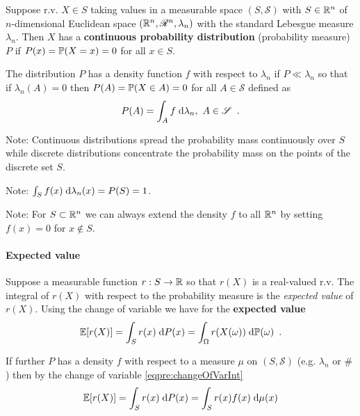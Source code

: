 \begin{definition}
Suppose r.v. $X \in S$ taking values in a measurable space $(S, \mathscr{S})$ with $S \in \mathbb{R}^n$ of $n$-dimensional Euclidean space $(\mathbb{R}^n, \mathscr{R}^n, \lambda_n)$ with the standard Lebesgue measure $\lambda_n$. Then $X$ has a \textbf{continuous probability distribution} (probability measure) $P$ if $P(x) = \mathbb{P}(X = x) = 0$ for all $x \in S$.
\end{definition}

The distribution $P$ has a density function $f$ with respect to $\lambda_n$ if $P \ll \lambda_n$ so that if $\lambda_n(A) = 0$ then $P(A) = \mathbb{P}(X \in A) = 0$ for all $A \in \mathscr{S}$ defined as
\begin{equation}
P(A) = \int_A f \; \text{d} \lambda_n, \ A \in \mathscr{S} \enspace .
\end{equation}

Note: Continuous distributions spread the probability mass continuously over $S$ while discrete distributions concentrate the probability mass on the points of the discrete set $S$.

Note: $\int_S f(x) \; \text{d} \lambda_n(x) = P(S) = 1$.

Note: For $S \subset \mathbb{R}^n$ we can always extend the density $f$ to all $\mathbb{R}^n$ by setting $f(x) = 0$ for $x \notin S$.

\paragraph{Expected value}

\begin{definition}
Suppose a measurable function $r : S \to \mathbb{R}$ so that $r(X)$ is a real-valued r.v.
The integral of $r(X)$ with respect to the probability measure is the \emph{expected value} of $r(X)$. Using the change of variable we have for the \textbf{expected value}
\begin{equation}
\mathbb{E}[r(X)] = \int_S r(x) \; \text{d} P(x) = \int_\Omega r(X(\omega)) \; \text{d} \mathbb{P}(\omega) \enspace .
\end{equation}
\end{definition}

If further $P$ has a density $f$ with respect to a measure $\mu$ on $(S, \mathscr{S})$ (e.g. $\lambda_n$ or $\#$) then by the change of variable \eqref{eqpre:changeOfVarInt}
\begin{equation}
\mathbb{E}[r(X)] = \int_S r(x) \; \text{d} P(x) = \int_S r(x) f(x) \; \text{d} \mu(x)
\end{equation}

